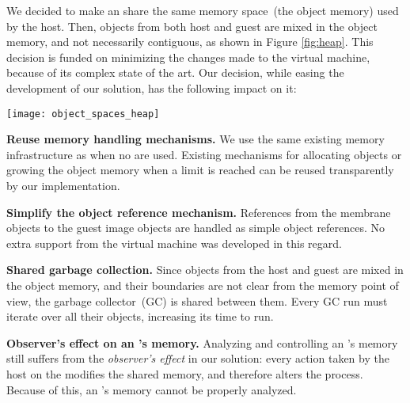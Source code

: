 We decided to make an \objectspace share the same memory space~(the object memory) used by the host. Then, objects from both host and guest are mixed in the object memory, and not necessarily contiguous, as shown in Figure \ref{fig:heap}. This decision is funded on minimizing the changes made to the virtual machine, because of its complex state of the art. Our decision, while easing the development of our solution, has the following impact on it:

\begin{figure*}[htb]
\begin{center}
\texttt{[image: object\_spaces\_heap]}
\caption{Objects from the host and guest are mixed in the object memory. In this figure, after the ,  and  host instances, follow the corresponding ones of the guest, which can in order be followed by objects of the host, like the string \textbf{`hi'}. \label{fig:heap}}
\end{center}
\end{figure*}

\begin{description}
	\item \textbf{Reuse memory handling mechanisms.} We use the same existing memory infrastructure as when no \objectspaces are used. Existing mechanisms for allocating objects or growing the object memory when a limit is reached can be reused transparently by our implementation. 
	\item \textbf{Simplify the object reference mechanism.} References from the membrane objects to the guest image objects are handled as simple object references. No extra support from the virtual machine was developed in this regard.
	\item \textbf{Shared garbage collection.} Since objects from the host and guest are mixed in the object memory, and their boundaries are not clear from the memory point of view, the garbage collector~(GC) is shared between them. Every GC run must iterate over all their objects, increasing its time to run.
	
	\item \textbf{Observer's effect on an \objectspace's memory.} Analyzing and controlling an \objectspace's memory still suffers from the \emph{observer's effect} in our solution: every action taken by the host on the \objectspace modifies the shared memory, and therefore alters the process. Because of this, an \objectspace's memory cannot be properly analyzed.
\end{description}


